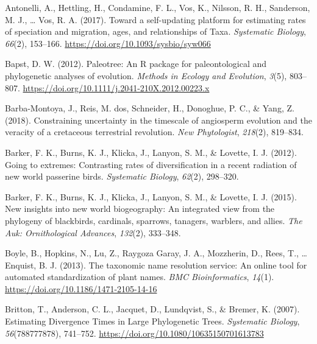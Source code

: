 \documentclass[
  english,
  man]{apa6}
\newlength{\cslhangindent}
\newlength{\cslentryspacingunit} %
\newenvironment{CSLReferences}[2] %
 {%
  \setlength{\parindent}{0pt}
  \ifodd #1
  \let\oldpar\par
  \def\par{\hangindent=\cslhangindent\oldpar}
  \fi
  \setlength{\parskip}{#2\cslentryspacingunit}
 }%
 {}
\begin{document}
\hypertarget{refs}{}
\begin{CSLReferences}{1}{0}
\leavevmode{}%
Antonelli, A., Hettling, H., Condamine, F. L., Vos, K., Nilsson, R. H., Sanderson, M. J., \ldots{} Vos, R. A. (2017). {Toward a self-updating platform for estimating rates of speciation and migration, ages, and relationships of Taxa}. \emph{Systematic Biology}, \emph{66}(2), 153--166. \url{https://doi.org/10.1093/sysbio/syw066}

\leavevmode{}%
Bapst, D. W. (2012). {Paleotree: An R package for paleontological and phylogenetic analyses of evolution}. \emph{Methods in Ecology and Evolution}, \emph{3}(5), 803--807. \url{https://doi.org/10.1111/j.2041-210X.2012.00223.x}

\leavevmode{}%
Barba-Montoya, J., Reis, M. dos, Schneider, H., Donoghue, P. C., \& Yang, Z. (2018). Constraining uncertainty in the timescale of angiosperm evolution and the veracity of a cretaceous terrestrial revolution. \emph{New Phytologist}, \emph{218}(2), 819--834.

\leavevmode{}%
Barker, F. K., Burns, K. J., Klicka, J., Lanyon, S. M., \& Lovette, I. J. (2012). Going to extremes: Contrasting rates of diversification in a recent radiation of new world passerine birds. \emph{Systematic Biology}, \emph{62}(2), 298--320.

\leavevmode{}%
Barker, F. K., Burns, K. J., Klicka, J., Lanyon, S. M., \& Lovette, I. J. (2015). New insights into new world biogeography: An integrated view from the phylogeny of blackbirds, cardinals, sparrows, tanagers, warblers, and allies. \emph{The Auk: Ornithological Advances}, \emph{132}(2), 333--348.

\leavevmode{}%
Boyle, B., Hopkins, N., Lu, Z., Raygoza Garay, J. A., Mozzherin, D., Rees, T., \ldots{} Enquist, B. J. (2013). {The taxonomic name resolution service: An online tool for automated standardization of plant names}. \emph{BMC Bioinformatics}, \emph{14}(1). \url{https://doi.org/10.1186/1471-2105-14-16}

\leavevmode{}%
Britton, T., Anderson, C. L., Jacquet, D., Lundqvist, S., \& Bremer, K. (2007). {Estimating Divergence Times in Large Phylogenetic Trees}. \emph{Systematic Biology}, \emph{56}(788777878), 741--752. \url{https://doi.org/10.1080/10635150701613783}


\end{CSLReferences}
\end{document}
